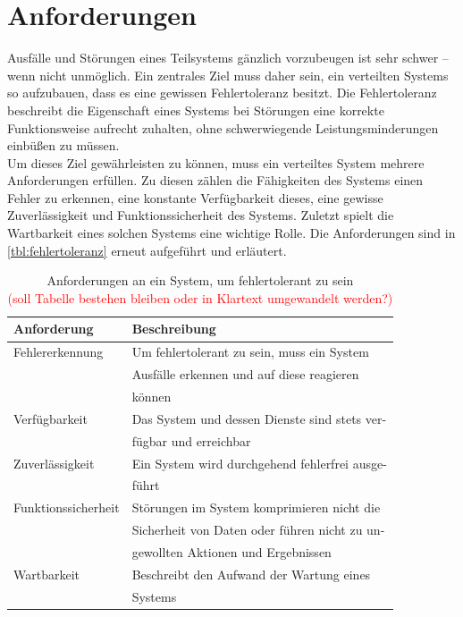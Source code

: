 \documentclass[12pt,a4paper,parskip=half]{scrreprt}
\begin{document}
\section{Anforderungen}
Ausfälle und Störungen eines Teilsystems gänzlich vorzubeugen ist sehr schwer -- wenn nicht unmöglich. Ein zentrales Ziel muss daher sein, ein verteilten Systems so aufzubauen, dass es eine gewissen Fehlertoleranz besitzt. Die Fehlertoleranz beschreibt die Eigenschaft eines Systems bei Störungen eine korrekte Funktionsweise aufrecht zuhalten, ohne schwerwiegende Leistungsminderungen einbüßen zu müssen. \\
Um dieses Ziel gewährleisten zu können, muss ein verteiltes System mehrere Anforderungen erfüllen. Zu diesen zählen die Fähigkeiten des Systems einen Fehler zu erkennen, eine konstante Verfügbarkeit dieses, eine gewisse Zuverlässigkeit und Funktionssicherheit des Systems. Zuletzt spielt die Wartbarkeit eines solchen Systems eine wichtige Rolle. Die Anforderungen sind in \autoref{tbl:fehlertoleranz} erneut aufgeführt und erläutert. 
\begin{table}[h]
	\centering
	\begin{tabular}[h]{ll}
		\toprule
		Anforderung 		& Beschreibung \\
		\midrule
		Fehlererkennung		& Um fehlertolerant zu sein, muss ein System \\
							& Ausfälle erkennen und auf diese reagieren \\
							& können \vspace{4pt} \\
		Verfügbarkeit 		& Das System und dessen Dienste sind stets ver-\\
							& fügbar und erreichbar \vspace{4pt}\\
		Zuverlässigkeit		& Ein System wird durchgehend fehlerfrei ausge-\\
							& führt \vspace{4pt}\\
		Funktionssicherheit	& Störungen im System komprimieren nicht die \\
							& Sicherheit von Daten oder führen nicht zu un- \\
							& gewollten Aktionen und Ergebnissen \vspace{4pt}\\
		Wartbarkeit 		& Beschreibt den Aufwand der Wartung eines\\
							& Systems 
							\\			
		\bottomrule
	\end{tabular}
	\captionsetup{font = small}
	\caption{Anforderungen an ein System, um fehlertolerant zu sein \\
		\textcolor{red}{(soll Tabelle bestehen bleiben oder in Klartext umgewandelt werden?)}}
	\label{tbl:fehlertoleranz}
\end{table}
\end{document}
